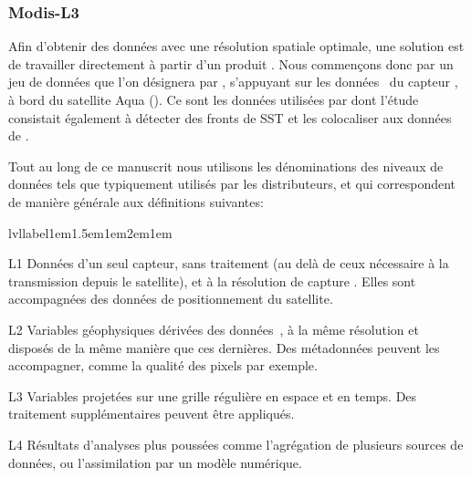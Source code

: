 
\subsubsection{Modis-L3}

Afin d'obtenir des données avec une résolution spatiale optimale, une solution est de travailler directement à partir d'un produit .
Nous commençons donc par un jeu de données que l'on désignera par , s'appuyant sur les données~ du capteur , à bord du satellite Aqua (\cite{kilpatrick_2015}).
Ce sont les données utilisées par \textcite{liu_2016}  dont l'étude consistait également à détecter des fronts de SST et les colocaliser aux données de .

\begin{note}[label={note:data-levels}, breakable]
  Tout au long de ce manuscrit nous utilisons les dénominations des niveaux de données tels que typiquement utilisés par les distributeurs, et qui correspondent de manière générale aux définitions suivantes:
  \newcommand*\lvllabel[1]{\hspace\labelsep \normalfont\bfseries\lfstyle #1}%
  \begin{flexlabelled}{lvllabel}{1em}{1.5em}{1em}{2em}{1em}
    \item[L1] Données d'un seul capteur, sans traitement (au delà de ceux nécessaire à la transmission depuis le satellite), et à la résolution de capture .
    Elles sont accompagnées des données de positionnement du satellite.

    \item[L2] Variables géophysiques dérivées des données~, à la même résolution et disposés de la même manière que ces dernières.
    Des métadonnées peuvent les accompagner, comme la qualité des pixels par exemple.

    \item[L3] Variables projetées sur une grille régulière en espace et en temps.
    Des traitement supplémentaires peuvent être appliqués.

    \item[L4] Résultats d'analyses plus poussées comme l’agrégation de plusieurs sources de données, ou l'assimilation par un modèle numérique.
  \end{flexlabelled}
\end{note}

